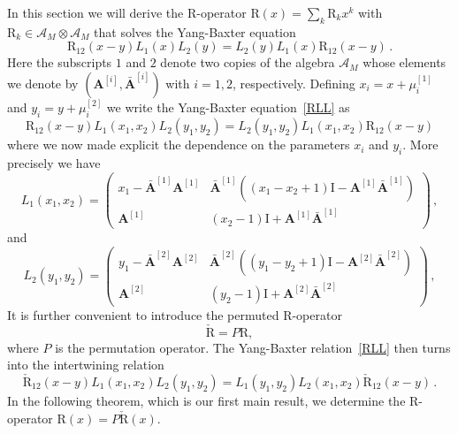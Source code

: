 \documentclass[11pt]{article}
\numberwithin{equation}{section}
\newcommand{\OA}{\mathbf{A}}
\newcommand{\OAD}{\mathbf{\bar{A}}}
\newcommand{\mmu}{\mu}
\newcommand{\ID}{\mathrm{I}}
\newcommand{\abrOSCR}{\mathrm{R}}
\begin{document}
		In this section we will derive the R-operator $\abrOSCR(x)=\sum_k \abrOSCR_k x^k $ with $\abrOSCR_k\in \mathcal{A}_M\otimes \mathcal{A}_M$ that solves the Yang-Baxter  equation
		\begin{equation}\label{RLL}
			\abrOSCR_{12}(x-y) L_1(x)L_2(y)= L_2(y) L_1(x)\abrOSCR_{12}(x-y)\,.
		\end{equation}
        Here the subscripts $1$ and $2$ denote two copies of the algebra $\mathcal{A}_M$ whose elements we denote by $(\OA^{[i]},\OAD^{[i]})$ with $i=1,2$,  respectively.
		        Defining $x_i=x+\mmu_i^{[1]}$ and $y_i=y+\mmu_i^{[2]}$ we write the Yang-Baxter equation~\eqref{RLL} as
		\begin{equation}
			\abrOSCR_{12}(x-y)L_{1}(x_{1},x_{2})L_{2}(y_{1},y_{2})=L_{2}(y_{1},y_{2})L_{1}(x_{1},x_{2})\abrOSCR_{12}(x-y)
		\end{equation}
where we now made explicit the dependence on the parameters $x_i$ and $y_i$. More precisely we have
		\begin{equation}\label{L1-u1u2}
			L_{1}(x_{1},x_{2})= \left(\begin{array}{cc}
			x_{1}-\OAD^{[1]}\OA^{[1]}&	\OAD^{[1]}\left((x_{1}-x_{2}+1)\ID-\OA^{[1]}\OAD^{[1]}\right)\\
				\OA^{[1]}&(x_{2}-1)\ID+\OA^{[1]}\OAD^{[1]}
			\end{array}\right) \,,
		\end{equation}
				and
		\begin{equation}\label{L2-u1u2}
			L_{2}(y_{1},y_{2})= \left(\begin{array}{cc}
			y_{1}-\OAD^{[2]}\OA^{[2]}&	\OAD^{[2]}\left((y_{1}-y_{2}+1)\ID-\OA^{[2]}\OAD^{[2]}\right)\\
				\OA^{[2]}&(y_{2}-1)\ID+\OA^{[2]}\OAD^{[2]}
			\end{array}\right) \,,
		\end{equation}
			It is further convenient to introduce the permuted R-operator
    \begin{equation}
\check{\abrOSCR}=P\abrOSCR,\end{equation} where $P$ is the permutation operator. The Yang-Baxter relation~\eqref{RLL} then turns into the intertwining relation
		\begin{equation}
			\check{\abrOSCR}_{12}(x-y)L_{1}(x_{1},x_{2})L_{2}(y_{1},y_{2})=L_{1}(y_{1},y_{2})L_{2}(x_{1},x_{2})\check{\abrOSCR}_{12}(x-y)\,.
		\end{equation}
																																							 		 In the following theorem, which is our first main result, we determine the R-operator $\abrOSCR(x)=P\check{\abrOSCR}(x)$.
\end{document}
